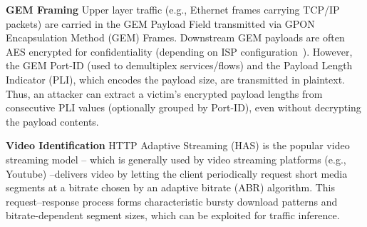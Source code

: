\documentclass[conference]{IEEEtran}
\begin{document}
\textbf{GEM Framing} Upper layer traffic (e.g., Ethernet frames carrying TCP/IP packets) are carried in the GEM Payload Field transmitted via GPON Encapsulation Method (GEM) Frames. Downstream GEM payloads are often AES encrypted for confidentiality (depending on ISP configuration~\cite{itu-g9843}). However, the GEM Port-ID (used to demultiplex services/flows) and the Payload Length Indicator (PLI), which encodes the payload size, are transmitted in plaintext. Thus, an attacker can extract a victim’s encrypted payload lengths from consecutive PLI values (optionally grouped by Port-ID), even without decrypting the payload contents.

\textbf{Video Identification} HTTP Adaptive Streaming (HAS) is the popular video streaming model -- which is generally used by video streaming platforms (e.g., Youtube) --delivers video by letting the client periodically request short media segments at a bitrate chosen by an adaptive bitrate (ABR) algorithm. This request--response process forms characteristic bursty download patterns and bitrate-dependent segment sizes, which can be exploited for traffic inference.~\cite{bae-sec22}
\end{document}
